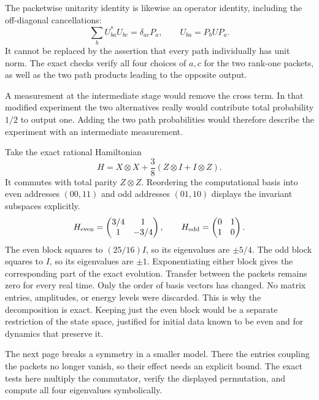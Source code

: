 The packetwise unitarity identity is likewise an operator identity, including the off-diagonal cancellations:
\[
\sum_b U_{ba}^*U_{bc}=\delta_{ac}P_a,
\qquad U_{ba}=P_bUP_a.
\]
It cannot be replaced by the assertion that every path individually has unit norm. The exact checks verify all four choices of $a,c$ for the two rank-one packets, as well as the two path products leading to the opposite output.

A measurement at the intermediate stage would remove the cross term. In that modified experiment the two alternatives really would contribute total probability $1/2$ to output one. Adding the two path probabilities would therefore describe the experiment with an intermediate measurement.

Take the exact rational Hamiltonian
\[
H=X\otimes X+\frac38(Z\otimes I+I\otimes Z).
\]
It commutes with total parity $Z\otimes Z$. Reordering the computational basis into even addresses $(00,11)$ and odd addresses $(01,10)$ displays the invariant subspaces explicitly.
\[
H_{\rm even}=\begin{pmatrix}3/4&1\\1&-3/4\end{pmatrix},\qquad
H_{\rm odd}=\begin{pmatrix}0&1\\1&0\end{pmatrix}.
\]
The even block squares to $(25/16)I$, so its eigenvalues are $\pm5/4$. The odd block squares to $I$, so its eigenvalues are $\pm1$. Exponentiating either block gives the corresponding part of the exact evolution. Transfer between the packets remains zero for every real time.
Only the order of basis vectors has changed. No matrix entries, amplitudes, or energy levels were discarded. This is why the decomposition is exact. Keeping just the even block would be a separate restriction of the state space, justified for initial data known to be even and for dynamics that preserve it.

The next page breaks a symmetry in a smaller model. There the entries coupling the packets no longer vanish, so their effect needs an explicit bound. The exact tests here multiply the commutator, verify the displayed permutation, and compute all four eigenvalues symbolically.

